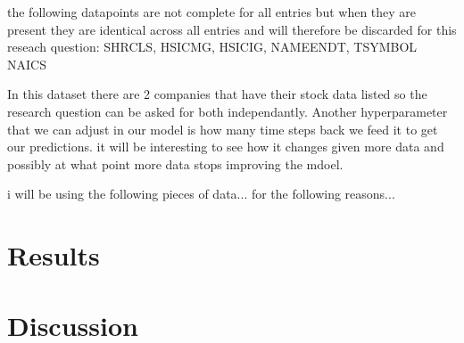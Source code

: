 \documentclass{report}
\begin{document}
the following datapoints are not complete for all entries but when they are present they are identical across all entries and will therefore be discarded for this reseach question: SHRCLS, HSICMG, HSICIG, NAMEENDT, TSYMBOL NAICS

In this dataset there are 2 companies that have their stock data listed so the research question can be asked for both independantly. Another hyperparameter that we can adjust in our model is how many time steps back we feed it to get our predictions. it will be interesting to see how it changes given more data and possibly at what point more data stops improving the mdoel.


i will be using the following pieces of data...
for the following reasons...

\section{Results}

\section{Discussion}
\end{document}
